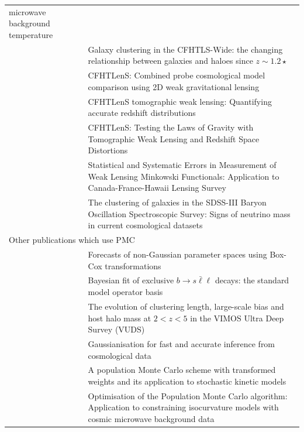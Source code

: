 \documentclass[11pt, chapterprefix, headsepline]{scrartcl}
\begin{document}
\begin{tabularx}{\textwidth}{lX}
  microwave background temperature \\
  \cite{CK11} & Galaxy clustering in the CFHTLS-Wide: the changing
  relationship between galaxies and haloes since $z \sim 1.2{\star}$ \\
  \cite{CFHTLenS-2pt-notomo} & CFHTLenS: Combined probe cosmological
  model comparison using 2D weak gravitational lensing \\
  \cite{CFHTLenS-2pt-tomo} & CFHTLenS tomographic weak lensing:
  Quantifying accurate redshift distributions \\
  \cite{CFHTLenS-mod-grav} & CFHTLenS: Testing the Laws of Gravity
  with Tomographic Weak Lensing and Redshift Space Distortions \\
  \cite{2013arXiv1312.5032S} & Statistical and Systematic Errors in Measurement of Weak Lensing Minkowski Functionals: Application to Canada-France-Hawaii Lensing Survey\\
  \cite{2014arXiv1403.4599B} & The clustering of galaxies in the SDSS-III Baryon Oscillation Spectroscopic Survey: Signs of neutrino mass in current cosmological datasets\\
  \multicolumn{2}{l}{Other publications which use PMC} \\ \hline
  \cite{2011arXiv1103.3370J} & Forecasts of non-Gaussian parameter
  spaces using Box-Cox transformations \\
  \cite{2012JHEP...08..030B} & Bayesian fit of exclusive $b \rightarrow s
  \bar \ell {\ell}$ decays: the standard model operator basis \\
  \cite{2014arXiv1411.5688D} & The evolution of clustering length, large-scale bias and host halo mass at $2 < z < 5$ in the VIMOS Ultra Deep Survey (VUDS) \\
  \cite{2015arXiv151000019S} & Gaussianisation for fast and accurate inference from cosmological data \\
  \cite{2012arXiv1208.5600K} & A population Monte Carlo scheme with transformed weights and its application to stochastic kinetic models \\
  \cite{2015arXiv151001486M} & Optimisation of the Population Monte Carlo algorithm: Application to constraining isocurvature models with cosmic microwave background data \\ 
\end{tabularx}




\end{document}
